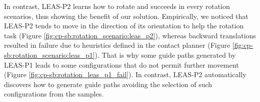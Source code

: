In contrast, LEAS-P2 learns how to rotate and succeeds in every rotation scenarios, thus showing the benefit of our solution.
Empirically, we noticed that LEAS-P2 tends to move in the direction of its orientation to help the rotation task (Figure \ref{fig:cp-sb:rotation_scenario:leas_p2}), whereas backward translations resulted in failure due to heuristics defined in the contact planner (Figure \ref{fig:cp-sb:rotation_scenario:leas_p1}).
That is why some guide paths generated by LEAS-P1 leads to some configurations that do not permit further movement (Figure \ref{fig:cp-sb:rotation_leas_p1_fail}). 
In contrast, LEAS-P2 automatically discovers how to generate guide paths avoiding the selection of such configurations from the samples.



